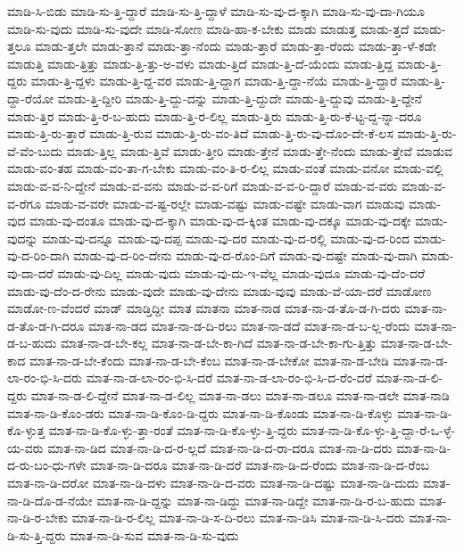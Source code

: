 {ಮಾಡಿ-ಸಿ-ಬಿಡು
ಮಾಡಿ-ಸು-ತ್ತಿ-ದ್ದಾರೆ
ಮಾಡಿ-ಸು-ತ್ತಿ-ದ್ದಾಳೆ
ಮಾಡಿ-ಸು-ವು-ದ-ಕ್ಕಾಗಿ
ಮಾಡಿ-ಸು-ವು-ದಾ-ಗಿಯೂ
ಮಾಡಿ-ಸು-ವುದು
ಮಾಡಿ-ಸು-ವುದೇ
ಮಾಡಿ-ಸೋಣ
ಮಾಡಿ-ಹಾ-ಕ-ಬೇಕು
ಮಾಡು
ಮಾಡುತ್ತ
ಮಾಡು-ತ್ತದೆ
ಮಾಡು-ತ್ತಲೂ
ಮಾಡು-ತ್ತಲೇ
ಮಾಡು-ತ್ತಾನೆ
ಮಾಡು-ತ್ತಾ-ನೆಂದು
ಮಾಡು-ತ್ತಾರೆ
ಮಾಡು-ತ್ತಾ-ರೆಂದು
ಮಾಡು-ತ್ತಾ-ಳೆ-ಕಡೇ
ಮಾಡುತ್ತಿ
ಮಾಡು-ತ್ತಿತ್ತು
ಮಾಡು-ತ್ತಿ-ತ್ತು-ಅ-ವಳು
ಮಾಡು-ತ್ತಿದೆ
ಮಾಡು-ತ್ತಿ-ದೆ-ಯೆಂದು
ಮಾಡು-ತ್ತಿದ್ದ
ಮಾಡು-ತ್ತಿ-ದ್ದರು
ಮಾಡು-ತ್ತಿ-ದ್ದಳು
ಮಾಡು-ತ್ತಿ-ದ್ದ-ವರ
ಮಾಡು-ತ್ತಿ-ದ್ದಾಗ
ಮಾಡು-ತ್ತಿ-ದ್ದಾ-ನೆಯೆ
ಮಾಡು-ತ್ತಿ-ದ್ದಾರೆ
ಮಾಡು-ತ್ತಿ-ದ್ದಾ-ರೆಯೋ
ಮಾಡು-ತ್ತಿ-ದ್ದೀರಿ
ಮಾಡು-ತ್ತಿ-ದ್ದು-ದನ್ನು
ಮಾಡು-ತ್ತಿ-ದ್ದುದೇ
ಮಾಡು-ತ್ತಿ-ದ್ದುವು
ಮಾಡು-ತ್ತಿ-ದ್ದೇನೆ
ಮಾಡು-ತ್ತಿರ
ಮಾಡು-ತ್ತಿ-ರ-ಬ-ಹುದು
ಮಾಡು-ತ್ತಿ-ರ-ಲಿಲ್ಲ
ಮಾಡು-ತ್ತಿರು
ಮಾಡು-ತ್ತಿ-ರು-ಕೆ-ಟ್ಟ-ದ್ದ-ನ್ನಾ-ದರೂ
ಮಾಡು-ತ್ತಿ-ರು-ತ್ತಾರೆ
ಮಾಡು-ತ್ತಿ-ರುವ
ಮಾಡು-ತ್ತಿ-ರು-ವಂ-ತಿದೆ
ಮಾಡು-ತ್ತಿ-ರು-ವು-ದೊಂ-ದೇ-ಕೆ-ಲಸ
ಮಾಡು-ತ್ತಿ-ರು-ವೆ-ವೆಂ-ಬುದು
ಮಾಡು-ತ್ತಿಲ್ಲ
ಮಾಡು-ತ್ತಿವೆ
ಮಾಡು-ತ್ತೀರಿ
ಮಾಡು-ತ್ತೇನೆ
ಮಾಡು-ತ್ತೇ-ನೆಂದು
ಮಾಡು-ತ್ತೇವೆ
ಮಾಡುವ
ಮಾಡು-ವಂ-ತಹ
ಮಾಡು-ವಂ-ತಾ-ಗ-ಬೇಕು
ಮಾಡು-ವಂ-ತಿ-ರ-ಲಿಲ್ಲ
ಮಾಡು-ವಂತೆ
ಮಾಡು-ವನೋ
ಮಾಡು-ವಲ್ಲಿ
ಮಾಡು-ವ-ವ-ನಿ-ದ್ದೇನೆ
ಮಾಡು-ವ-ವನು
ಮಾಡು-ವ-ವ-ರಿಗೆ
ಮಾಡು-ವ-ವ-ರಿ-ದ್ದಾರೆ
ಮಾಡು-ವ-ವರು
ಮಾಡು-ವ-ವ-ರೆಗೂ
ಮಾಡು-ವ-ವರೇ
ಮಾಡು-ವ-ಷ್ಟ-ರಲ್ಲೇ
ಮಾಡು-ವಷ್ಟು
ಮಾಡು-ವಷ್ಟೇ
ಮಾಡು-ವಾಗ
ಮಾಡುವು
ಮಾಡು-ವುದ
ಮಾಡು-ವು-ದಂತೂ
ಮಾಡು-ವು-ದ-ಕ್ಕಾಗಿ
ಮಾಡು-ವು-ದ-ಕ್ಕಿಂತ
ಮಾಡು-ವು-ದಕ್ಕೂ
ಮಾಡು-ವು-ದಕ್ಕೇ
ಮಾಡು-ವುದನ್ನು
ಮಾಡು-ವು-ದನ್ನೂ
ಮಾಡು-ವು-ದಪ್ಪ
ಮಾಡು-ವು-ದರ
ಮಾಡು-ವು-ದ-ರಲ್ಲಿ
ಮಾಡು-ವು-ದ-ರಿಂದ
ಮಾಡು-ವು-ದ-ರಿಂ-ದಾಗಿ
ಮಾಡು-ವು-ದ-ರಿಂ-ದೇನು
ಮಾಡು-ವು-ದ-ರೊಂ-ದಿಗೆ
ಮಾಡು-ವು-ದಷ್ಟೇ
ಮಾಡು-ವು-ದಾಗಿ
ಮಾಡು-ವು-ದಾ-ದರೆ
ಮಾಡು-ವು-ದಿಲ್ಲ
ಮಾಡು-ವುದು
ಮಾಡು-ವು-ದು-ಇ-ವೆಲ್ಲ
ಮಾಡು-ವುದೂ
ಮಾಡು-ವು-ದೆಂ-ದರೆ
ಮಾಡು-ವು-ದೆಂ-ದ-ರೇನು
ಮಾಡು-ವುದೇ
ಮಾಡು-ವು-ದೇನು
ಮಾಡು-ವುವು
ಮಾಡು-ವೆ-ಯಾ-ದರೆ
ಮಾಡೋಣ
ಮಾಡೋ-ಣ-ವೆಂದರೆ
ಮಾಡ್
ಮಾಡ್ತಿದ್ದೀ
ಮಾತ
ಮಾತನಾ
ಮಾತ-ನಾಡ
ಮಾತ-ನಾ-ಡ-ತೊ-ಡ-ಗಿ-ದರು
ಮಾತ-ನಾ-ಡ-ತೊ-ಡ-ಗಿ-ದರೂ
ಮಾತ-ನಾ-ಡದ
ಮಾತ-ನಾ-ಡ-ದಿ-ರಲು
ಮಾತ-ನಾ-ಡದೆ
ಮಾತ-ನಾ-ಡ-ಬ-ಲ್ಲ-ರೆಂದು
ಮಾತ-ನಾ-ಡ-ಬ-ಹುದು
ಮಾತ-ನಾ-ಡ-ಬೇ-ಕಲ್ಲ
ಮಾತ-ನಾ-ಡ-ಬೇ-ಕಾ-ಗಿದೆ
ಮಾತ-ನಾ-ಡ-ಬೇ-ಕಾ-ಗು-ತ್ತಿತ್ತು
ಮಾತ-ನಾ-ಡ-ಬೇ-ಕಾದ
ಮಾತ-ನಾ-ಡ-ಬೇ-ಕೆಂದು
ಮಾತ-ನಾ-ಡ-ಬೇ-ಕೆಂಬ
ಮಾತ-ನಾ-ಡ-ಬೇಕೋ
ಮಾತ-ನಾ-ಡ-ಬೇಡಿ
ಮಾತ-ನಾ-ಡ-ಲಾ-ರಂ-ಭಿ-ಸಿ-ದರು
ಮಾತ-ನಾ-ಡ-ಲಾ-ರಂ-ಭಿ-ಸಿ-ದರೆ
ಮಾತ-ನಾ-ಡ-ಲಾ-ರಂ-ಭಿ-ಸಿ-ದ-ರೆಂ-ದರೆ
ಮಾತ-ನಾ-ಡ-ಲಿ-ದ್ದರು
ಮಾತ-ನಾ-ಡ-ಲಿ-ದ್ದೇನೆ
ಮಾತ-ನಾ-ಡ-ಲಿಲ್ಲ
ಮಾತ-ನಾ-ಡಲು
ಮಾತ-ನಾ-ಡಲೂ
ಮಾತ-ನಾ-ಡಲೇ
ಮಾತ-ನಾಡಿ
ಮಾತ-ನಾ-ಡಿ-ಕೊಂ-ಡರು
ಮಾತ-ನಾ-ಡಿ-ಕೊಂ-ಡಿ-ದ್ದರು
ಮಾತ-ನಾ-ಡಿ-ಕೊಂಡು
ಮಾತ-ನಾ-ಡಿ-ಕೊಳ್ಳು
ಮಾತ-ನಾ-ಡಿ-ಕೊ-ಳ್ಳುತ್ತ
ಮಾತ-ನಾ-ಡಿ-ಕೊ-ಳ್ಳು-ತ್ತಾ-ರಂತೆ
ಮಾತ-ನಾ-ಡಿ-ಕೊ-ಳ್ಳು-ತ್ತಿ-ದ್ದರು
ಮಾತ-ನಾ-ಡಿ-ಕೊ-ಳ್ಳು-ತ್ತಿ-ದ್ದಾ-ರೆ-ಒ-ಳ್ಳೆ-ಯ-ವರು
ಮಾತ-ನಾ-ಡಿದ
ಮಾತ-ನಾ-ಡಿ-ದ-ರ-ಲ್ಲದೆ
ಮಾತ-ನಾ-ಡಿ-ದ-ರಾ-ದರೂ
ಮಾತ-ನಾ-ಡಿ-ದರು
ಮಾತ-ನಾ-ಡಿ-ದ-ರು-ಬಂ-ಧು-ಗಳೇ
ಮಾತ-ನಾ-ಡಿ-ದರೂ
ಮಾತ-ನಾ-ಡಿ-ದರೆ
ಮಾತ-ನಾ-ಡಿ-ದ-ರೆಂದು
ಮಾತ-ನಾ-ಡಿ-ದ-ರೆಂಬ
ಮಾತ-ನಾ-ಡಿ-ದರೋ
ಮಾತ-ನಾ-ಡಿ-ದಳು
ಮಾತ-ನಾ-ಡಿ-ದ-ವರು
ಮಾತ-ನಾ-ಡಿ-ದಷ್ಟು
ಮಾತ-ನಾ-ಡಿ-ದುದು
ಮಾತ-ನಾ-ಡಿ-ದೊ-ಡ-ನೆಯೇ
ಮಾತ-ನಾ-ಡಿ-ದ್ದನ್ನು
ಮಾತ-ನಾ-ಡಿದ್ದು
ಮಾತ-ನಾ-ಡಿದ್ದೇ
ಮಾತ-ನಾ-ಡಿ-ರ-ಬ-ಹುದು
ಮಾತ-ನಾ-ಡಿ-ರ-ಬೇಕು
ಮಾತ-ನಾ-ಡಿ-ರ-ಲಿಲ್ಲ
ಮಾತ-ನಾ-ಡಿ-ಸ-ದಿ-ರಲು
ಮಾತ-ನಾ-ಡಿಸಿ
ಮಾತ-ನಾ-ಡಿ-ಸಿ-ದರು
ಮಾತ-ನಾ-ಡಿ-ಸು-ತ್ತಿ-ದ್ದರು
ಮಾತ-ನಾ-ಡಿ-ಸುವ
ಮಾತ-ನಾ-ಡಿ-ಸು-ವುದು
}
